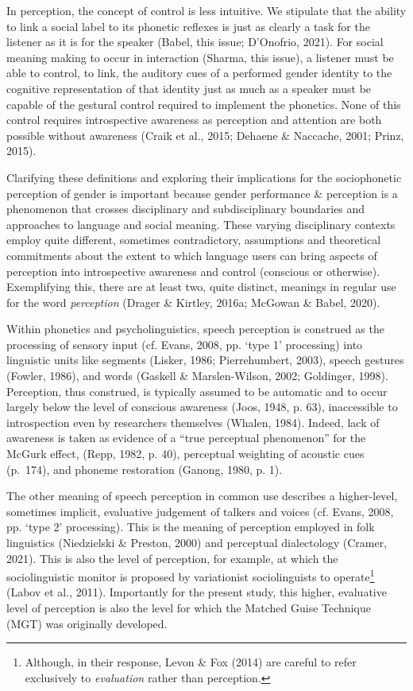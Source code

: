 \documentclass[
  letterpaper,
  DIV=11,
  numbers=noendperiod]{scrartcl}
\begin{document}
In perception, the concept of control is less intuitive. We stipulate
that the ability to link a social label to its phonetic reflexes is just
as clearly a task for the listener as it is for the speaker (Babel, this
issue; D'Onofrio, 2021). For social meaning making to occur in
interaction (Sharma, this issue), a listener must be able to control, to
link, the auditory cues of a performed gender identity to the cognitive
representation of that identity just as much as a speaker must be
capable of the gestural control required to implement the phonetics.
None of this control requires introspective awareness as perception and
attention are both possible without awareness (Craik et al., 2015;
Dehaene \& Naccache, 2001; Prinz, 2015).

Clarifying these definitions and exploring their implications for the
sociophonetic perception of gender is important because gender
performance \& perception is a phenomenon that crosses disciplinary and
subdisciplinary boundaries and approaches to language and social
meaning. These varying disciplinary contexts employ quite different,
sometimes contradictory, assumptions and theoretical commitments about
the extent to which language users can bring aspects of perception into
introspective awareness and control (conscious or otherwise).
Exemplifying this, there are at least two, quite distinct, meanings in
regular use for the word \emph{perception} (Drager \& Kirtley, 2016a;
McGowan \& Babel, 2020).

Within phonetics and psycholinguistics, speech perception is construed
as the processing of sensory input (cf. Evans, 2008, pp. `type 1'
processing) into linguistic units like segments (Lisker, 1986;
Pierrehumbert, 2003), speech gestures (Fowler, 1986), and words (Gaskell
\& Marslen-Wilson, 2002; Goldinger, 1998). Perception, thus construed,
is typically assumed to be automatic and to occur largely below the
level of conscious awareness (Joos, 1948, p. 63), inaccessible to
introspection even by researchers themselves (Whalen, 1984). Indeed,
lack of awareness is taken as evidence of a ``true perceptual
phenomenon'' for the McGurk effect, (Repp, 1982, p. 40), perceptual
weighting of acoustic cues (p.~174), and phoneme restoration (Ganong,
1980, p. 1).

The other meaning of speech perception in common use describes a
higher-level, sometimes implicit, evaluative judgement of talkers and
voices (cf. Evans, 2008, pp. `type 2' processing). This is the meaning
of perception employed in folk linguistics (Niedzielski \& Preston,
2000) and perceptual dialectology (Cramer, 2021). This is also the level
of perception, for example, at which the sociolinguistic monitor is
proposed by variationist sociolinguists to operate\footnote{Although, in
  their response, Levon \& Fox (2014) are careful to refer exclusively
  to \emph{evaluation} rather than perception.} (Labov et al., 2011).
Importantly for the present study, this higher, evaluative level of
perception is also the level for which the Matched Guise Technique (MGT)
was originally developed.
\end{document}
